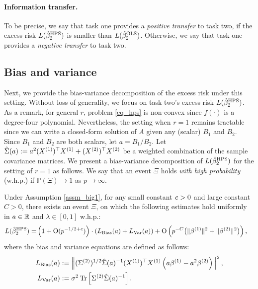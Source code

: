 \paragraph{Information transfer.} To be precise, we say that task one provides a \textit{positive transfer} to task two, if the excess risk $L(\hat{\beta}_2^{\textup{HPS}})$ is smaller than $L(\hat{\beta}_2^{\textup{OLS}})$.
Otherwise, we say that task one provides a \textit{negative transfer} to task two.

\subsection{Bias and variance}


Next, we provide the bias-variance decomposition of the excess risk under this setting.
Without loss of generality, we focus on task two's excess risk $L(\hat{\beta}^{\textup{HPS}}_2)$.
As a remark, for general $r$, problem \eqref{eq_hps} is non-convex since $f(\cdot)$ is a degree-four polynomial.
Nevertheless, the setting when $r = 1$ remains tractable since we can write a closed-form solution of $A$ given any (scalar) $B_1$ and $B_2$.
Since $B_1$ and $B_2$ are both scalars, let $a = B_1 / B_2$.
Let $\hat{\Sigma}(a) := a^2 (X^{(1)})^{\top} X^{(1)} + (X^{(2)})^{\top} X^{(2)}$ be a weighted combination of the sample covariance matrices.
We present a bias-variance decomposition of $L(\hat{\beta}^{\textup{HPS}}_2)$ for the setting of $r = 1$ as follows.
We say that an event $\Xi$ holds \emph{with high probability} (w.h.p.) if $\mathbb P(\Xi)\to 1$ as $p\to \infty$.

\begin{proposition}\label{lem_HPS_loss}
     Under Assumption \ref{assm_big1}, for any small constant ${\mathit{c}}>0$ and large constant $C>0$, there exists an event $\Xi$, on which the following estimates hold uniformly in $a\in \mathbb{R}$ and $\lambda\in [0,1]$ w.h.p.:
    \begin{align}
        L(\hat{\beta}_2^{\MTL}) =& \left( 1+ \OO(p^{-1/2+c})\right)\cdot \left(L_{\bias} (a) + L_{\var}(a)\right) %
        + \OO \left( p^{-C}\big( \|\beta^{(1)} \|^2  +  \|\beta^{(2)} \|^2\big)   \right), \label{L_HPS_simple}
    \end{align}
    where the bias and variance equations are defined as follows:
    \begin{align}
        L_{\textup{Bias}} (a) &:= \left\| (\Sigma^{(2)})^{1/2}\hat \Sigma(a)^{-1} (X^{(1)})^\top X^{(1)} \left(a\beta^{(1)}- a^2\beta^{(2)}\right) \right\|^2,  \label{Lbias} \\
        L_{\operatorname{Var}}(a)   &:= \sigma^2  \operatorname{Tr}\left[{\Sigma^{(2)}\hat \Sigma(a)^{-1}  }\right].  \label{Lvar}
    \end{align}
\end{proposition}



